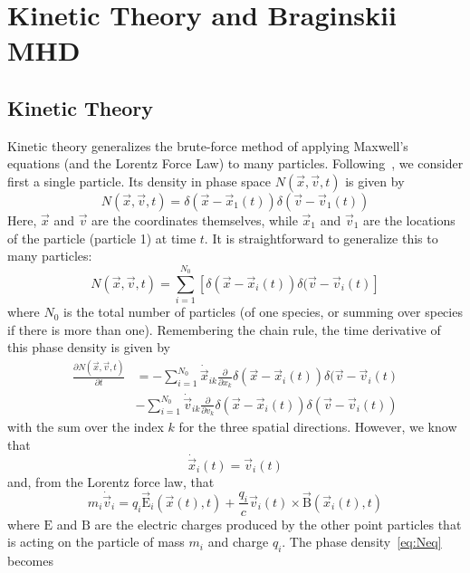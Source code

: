 \chapter{Kinetic Theory and Braginskii MHD}
\section{Kinetic Theory}
Kinetic theory generalizes the brute-force method of applying Maxwell's equations (and the Lorentz Force Law) to many particles. Following~\cite{Nicholson}, we consider first a single particle. Its density in phase space $N(\vec x,\vec v,t)$ is given by
\begin{equation*}
  N(\vec x,\vec v,t)=\delta(\vec x-\vec x_1(t))\delta(\vec v-\vec v_1(t))
\end{equation*}
Here, $\vec x$ and $\vec v$ are the coordinates themselves, while $\vec x_1$ and $\vec v_1$ are the locations of the particle (particle 1) at time $t$. It is straightforward to generalize this to many particles:
\begin{equation*}
  N(\vec x,\vec v,t)=\sum_{i=1}^{N_0} \left[\delta(\vec x-\vec x_i(t))\delta(\vec v-\vec v_i(t)\right]
\end{equation*}
where $N_0$ is the total number of particles (of one species, or summing over species if there is more than one). Remembering the chain rule, the time derivative of this phase density is given by
\begin{align}
  \frac{\partial N(\vec x,\vec v,t)}{\partial t}&=-\sum_{i=1}^{N_0} \dot{\vec x}_{ik} \frac{\partial}{\partial x_k}\delta(\vec x-\vec x_i(t))\delta(\vec v-\vec v_i(t)\nonumber\\
  &-\sum_{i=1}^{N_0} \dot{\vec v}_{ik}\frac{\partial}{\partial v_k}\delta(\vec x-\vec x_i(t))\delta(\vec v-\vec v_i(t))\label{eq:Neq}
\end{align}
with the sum over the index $k$ for the three spatial directions. However, we know that
\begin{equation*}
  \dot{\vec x}_i(t)=\vec v_i(t)
\end{equation*}
and, from the Lorentz force law, that
\begin{equation*}
  m_i\dot{\vec v}_i=q_i \vec{\mathrm{E}}_i(\vec x(t),t)+\frac{q_i}{c}\vec v_i(t)\times\vec{\mathrm{B}}(\vec x_i(t),t)
\end{equation*}
where $\mathrm{E}$ and $\mathrm{B}$ are the electric charges produced by the other point particles that is acting on the particle of mass $m_i$ and charge $q_i$. The phase density~\ref{eq:Neq} becomes
